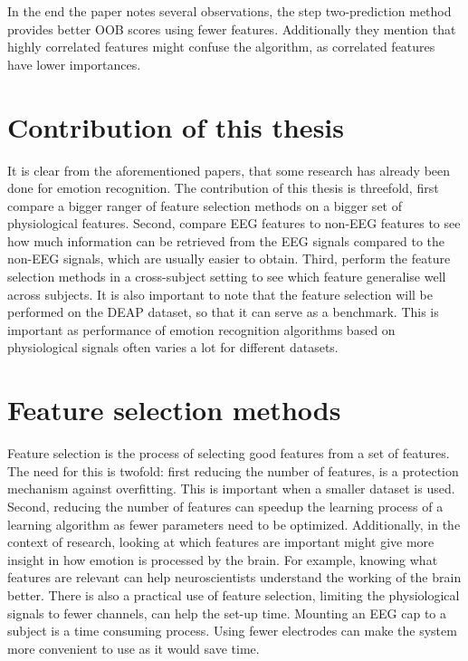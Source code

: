 \npar

In the end the paper notes several observations, the step two-prediction method provides better OOB scores using fewer features. Additionally they mention that highly correlated features might confuse the algorithm, as correlated features have lower importances.

\section{Contribution of this thesis}

It is clear from the aforementioned papers, that some research has already been done for emotion recognition. The contribution of this thesis is threefold, first compare a bigger ranger of feature selection methods on a bigger set of physiological features. Second, compare EEG features to non-EEG features to see how much information can be retrieved from the EEG signals compared to the non-EEG signals, which are usually easier to obtain. Third, perform the feature selection methods in a cross-subject setting to see which feature generalise well across subjects. It is also important to note that the feature selection will be performed on the DEAP dataset, so that it can serve as a benchmark. This is important as performance of emotion recognition algorithms based on physiological signals often varies a lot for different datasets\citep{PhytoEm}.

\section{Feature selection methods}
\label{FSSel}
Feature selection is the process of selecting good features from a set of features. The need for this is twofold: first reducing the number of features, is a protection mechanism against overfitting\citep{rfPaper}. This is important when a smaller dataset is used. Second, reducing the number of features can speedup the learning process of a learning algorithm as fewer parameters need to be optimized. Additionally, in the context of research, looking at which features are important might give more insight in how emotion is processed by the brain. For example, knowing what features are relevant can help neuroscientists understand the working of the brain better. There is also a practical use of feature selection, limiting the physiological signals to fewer channels, can help the set-up time. Mounting an EEG cap to a subject is a time consuming process. Using fewer electrodes can make the system more convenient to use as it would save time.

